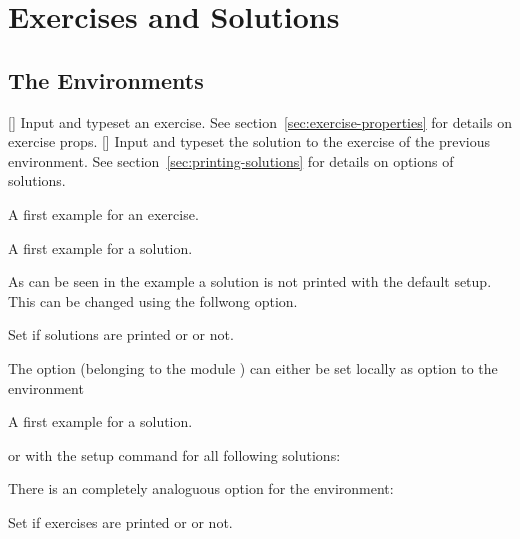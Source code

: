 \documentclass[load-preamble+]{cnltx-doc}
\begin{document}
\section{Exercises and Solutions}

\subsection{The Environments}

\begin{environments}
  []
    Input and typeset an exercise.  See section~\ref{sec:exercise-properties}
    for details on exercise \acsp*{prop}.
  []
    Input and typeset the solution to the exercise of the previous
     environment.  See section~\ref{sec:printing-solutions} for
    details on options of solutions.
\end{environments}

\begin{example}[outside]
  \begin{exercise}
    A first example for an exercise.
  \end{exercise}
  \begin{solution}
    A first example for a solution.
  \end{solution}
\end{example}

As can be seen in the example a solution is not printed with the default
setup.  This can be changed using the follwong option.
\begin{options}
    Set if solutions are printed or or not.
\end{options}

The option (belonging to the module ) can either be set
locally as option to the  environment
\begin{sourcecode}
  \begin{solution}[print=true]
    A first example for a solution.
  \end{solution}
\end{sourcecode}
or with the setup command for all following solutions:
\begin{sourcecode}
\end{sourcecode}

There is an completely analoguous option for the  environment:
\begin{options}
    Set if exercises are printed or or not.
\end{options}
\end{document}
